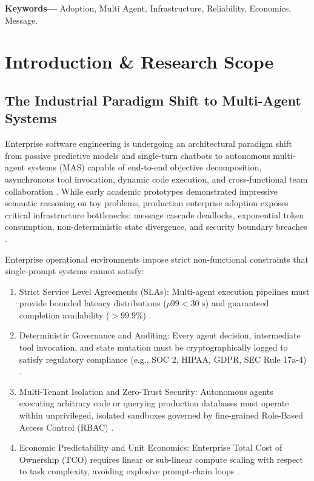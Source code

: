 \documentclass[10pt,twocolumn,letterpaper]{article}
\begin{document}
\noindent\textbf{Keywords---} Adoption, Multi Agent, Infrastructure, Reliability, Economics, Message.







\section{Introduction \& Research Scope}



\subsection{The Industrial Paradigm Shift to Multi-Agent Systems}


Enterprise software engineering is undergoing an architectural paradigm shift from passive predictive models and single-turn chatbots to autonomous multi-agent systems (MAS) capable of end-to-end objective decomposition, asynchronous tool invocation, dynamic code execution, and cross-functional team collaboration \cite{arxiv_2405_01543,arxiv_2005_14165}. While early academic prototypes demonstrated impressive semantic reasoning on toy problems, production enterprise adoption exposes critical infrastructure bottlenecks: message cascade deadlocks, exponential token consumption, non-deterministic state divergence, and security boundary breaches \cite{arxiv_2404_04289,crossref_10_1016_j_aei_2026_104392}.

Enterprise operational environments impose strict non-functional constraints that single-prompt systems cannot satisfy:
\begin{enumerate}
  \item Strict Service Level Agreements (SLAs): Multi-agent execution pipelines must provide bounded latency distributions ($p99 < 30\text{ s}$) and guaranteed completion availability ($>99.9\%$) \cite{crossref_10_1108_jeim_12_2025_1269}.
  \item Deterministic Governance and Auditing: Every agent decision, intermediate tool invocation, and state mutation must be cryptographically logged to satisfy regulatory compliance (e.g., SOC 2, HIPAA, GDPR, SEC Rule 17a-4) \cite{arxiv_2411_15594}.
  \item Multi-Tenant Isolation and Zero-Trust Security: Autonomous agents executing arbitrary code or querying production databases must operate within unprivileged, isolated sandboxes governed by fine-grained Role-Based Access Control (RBAC) \cite{arxiv_2404_04289,doaj_001772c2113c476d9d5d40452c8e10e1}.
  \item Economic Predictability and Unit Economics: Enterprise Total Cost of Ownership (TCO) requires linear or sub-linear compute scaling with respect to task complexity, avoiding explosive prompt-chain loops \cite{arxiv_2406_00584}.
\end{enumerate}
\end{document}

